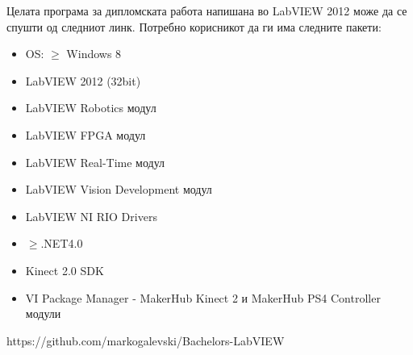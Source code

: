 \documentclass[12pt]{article}
\begin{document}
    Целата програма за дипломската работа напишана во LabVIEW 2012 може да се спушти од следниот линк. Потребно корисникот да ги има следните пакети:
    \begin{itemize}
      \item OS: $\geq$ Windows 8
      \item LabVIEW 2012 (32bit)
      \item LabVIEW Robotics модул
      \item LabVIEW FPGA модул
      \item LabVIEW Real-Time модул
      \item LabVIEW Vision Development модул
      \item LabVIEW NI RIO Drivers
      \item $\geq$.NET4.0
      \item Kinect 2.0 SDK
      \item VI Package Manager - MakerHub Kinect 2 и MakerHub PS4 Controller модули
      \end{itemize}

    https://github.com/markogalevski/Bachelors-LabVIEW
\medskip
\newpage
\printbibliography[heading=bibintoc,title={Користена литература}]
\end{document}
